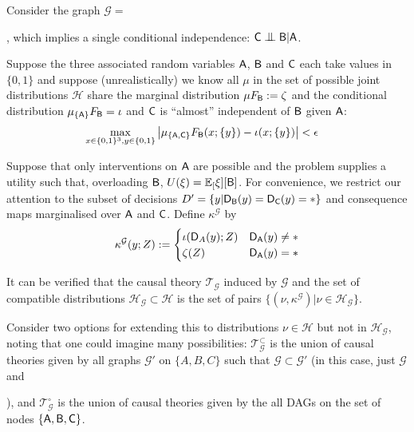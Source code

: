 \begin{example}\label{ex:extn_cbn}

Consider the graph $\mathcal{G}=$, which implies a single conditional independence: $\RV{C}\CI \RV{B}|\RV{A}$.

Suppose the three associated random variables $\mathsf{A}$, $\mathsf{B}$ and $\mathsf{C}$ each take values in $\{0,1\}$ and suppose (unrealistically) we know all $\mu$ in the set of possible joint distributions $\mathscr{H}$ share the marginal distribution $\mu F_{\mathsf{B}} := \zeta$ and the conditional distribution $\mu_{\{\mathsf{A}\}} F_{\mathsf{B}} = \iota$ and $\mathsf{C}$ is ``almost'' independent of $\mathsf{B}$ given $\mathsf{A}$:
\begin{align}
    \max_{x\in\{0,1\}^3,y\in\{0,1\}}\left|\mu_{\{\mathsf{A},\mathsf{C}\}} F_{\mathsf{B}}(x;\{y\}) - \iota(x;\{y\}) \right| &< \epsilon \label{eq:app_ci}
\end{align}

Suppose that only interventions on $\mathsf{A}$ are possible and the problem supplies a utility such that, overloading $\mathsf{B}$, $U(\xi)=\mathbb{E}_[\xi][\mathsf{B}]$. For convenience, we restrict our attention to the subset of decisions $D'=\{y|\mathsf{D}_{\mathsf{B}}(y)=\mathsf{D}_{\mathsf{C}}(y)=*\}$ and consequence maps marginalised over $\mathsf{A}$ and $\mathsf{C}$. Define $\kappa^{\mathcal{G}}$ by
\begin{align}
    \kappa^{\mathcal{G}}(y;Z) := \begin{cases} \iota(\mathsf{D}_A(y);Z) & \mathsf{D}_{\mathsf{A}}(y) \neq *\\
                                              \zeta(Z) & \mathsf{D}_{\mathsf{A}}(y) = *\end{cases}
\end{align}

It can be verified that the causal theory $\mathscr{T}_{\mathcal{G}}$ induced by $\mathcal{G}$ and the set of compatible distributions $\mathscr{H}_\mathcal{G}\subset\mathscr{H}$ is the set of pairs $\{(\nu,\kappa^{\mathcal{G}} )|\nu\in \mathscr{H}_{\mathcal{G}}\}$.

Consider two options for extending this to distributions $\nu\in \mathscr{H}$ but not in $\mathscr{H}_{\mathcal{G}}$, noting that one could imagine many possibilities: $\mathscr{T}_{\mathcal{G}}^\subset$ is the union of causal theories given by all graphs $\mathcal{G}'$ on $\{A, B, C\}$ such that $\mathcal{G}\subset \mathcal{G}'$ (in this case, just $\mathcal{G}$ and ), and  $\mathscr{T}_{\mathcal{G}}^\circ$ is the union of causal theories given by the all DAGs on the set of nodes $\{\mathsf{A}, \mathsf{B}, \mathsf{C}\}$.


\end{example}
